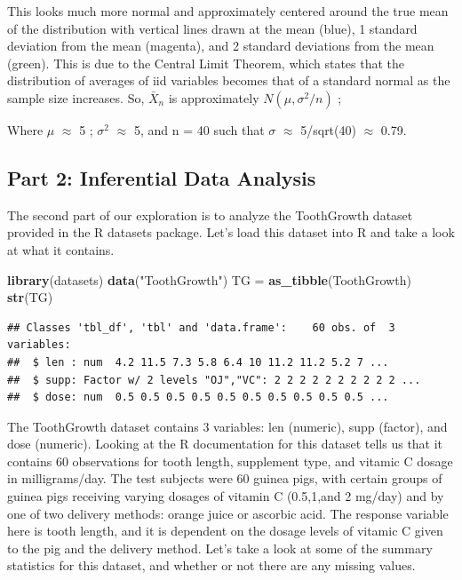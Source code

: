 \documentclass[
]{article}
\newenvironment{Shaded}{\begin{snugshade}}{\end{snugshade}}
\newcommand{\KeywordTok}[1]{\textcolor[rgb]{0.13,0.29,0.53}{\textbf{#1}}}
\newcommand{\NormalTok}[1]{#1}
\newcommand{\StringTok}[1]{\textcolor[rgb]{0.31,0.60,0.02}{#1}}
\begin{document}
This looks much more normal and approximately centered around the true
mean of the distribution with vertical lines drawn at the mean (blue), 1
standard deviation from the mean (magenta), and 2 standard deviations
from the mean (green). This is due to the Central Limit Theorem, which
states that the distribution of averages of iid variables becomes that
of a standard normal as the sample size increases. So, \(\bar X_n\) is
approximately \(N(\mu, \sigma^2 / n)\) ;

Where \(\mu\) \(\approx\) 5 ; \(\sigma^2\) \(\approx\) 5, and n = 40
such that \(\sigma\) \(\approx\) 5/sqrt(40) \(\approx\) 0.79.

\hypertarget{part-2-inferential-data-analysis}{%
\subsection{Part 2: Inferential Data
Analysis}\label{part-2-inferential-data-analysis}}

The second part of our exploration is to analyze the ToothGrowth dataset
provided in the R datasets package. Let's load this dataset into R and
take a look at what it contains.

\begin{Shaded}
\begin{Highlighting}[]
\KeywordTok{library}\NormalTok{(datasets)}
\KeywordTok{data}\NormalTok{(}\StringTok{"ToothGrowth"}\NormalTok{)}
\NormalTok{TG =}\StringTok{ }\KeywordTok{as_tibble}\NormalTok{(ToothGrowth)}
\KeywordTok{str}\NormalTok{(TG)}
\end{Highlighting}
\end{Shaded}

\begin{verbatim}
## Classes 'tbl_df', 'tbl' and 'data.frame':    60 obs. of  3 variables:
##  $ len : num  4.2 11.5 7.3 5.8 6.4 10 11.2 11.2 5.2 7 ...
##  $ supp: Factor w/ 2 levels "OJ","VC": 2 2 2 2 2 2 2 2 2 2 ...
##  $ dose: num  0.5 0.5 0.5 0.5 0.5 0.5 0.5 0.5 0.5 0.5 ...
\end{verbatim}

The ToothGrowth dataset contains 3 variables: len (numeric), supp
(factor), and dose (numeric). Looking at the R documentation for this
dataset tells us that it contains 60 observations for tooth length,
supplement type, and vitamic C dosage in milligrams/day. The test
subjects were 60 guinea pigs, with certain groups of guinea pigs
receiving varying dosages of vitamin C (0.5,1,and 2 mg/day) and by one
of two delivery methods: orange juice or ascorbic acid. The response
variable here is tooth length, and it is dependent on the dosage levels
of vitamic C given to the pig and the delivery method. Let's take a look
at some of the summary statistics for this dataset, and whether or not
there are any missing values.
\end{document}
